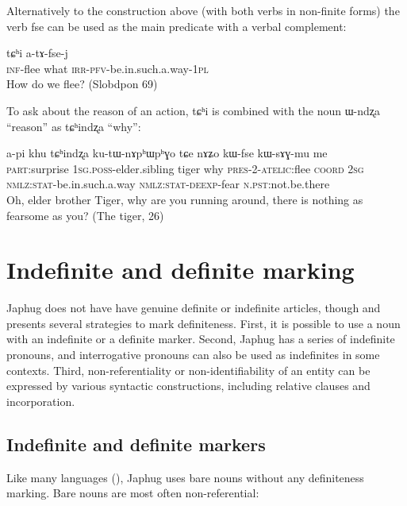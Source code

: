 \documentclass[oldfontcommands,oneside,a4paper,11pt]{memoir}
\newcommand{\ipa}[1]{{\phon #1}} %
\newcommand{\coord}{\textsc{coord}}
\newcommand{\inftv}{\textsc{inf}}
\newcommand{\irr}{\textsc{irr}}
\newcommand{\nmlz}{\textsc{nmlz}}
\newcommand{\npst}{\textsc{n.pst}}
\newcommand{\pfv}{\textsc{pfv}}
\newcommand{\pl}{\textsc{pl}}
\newcommand{\poss}{\textsc{poss}}
\newcommand{\pres}{\textsc{pres}}
\newcommand{\sg}{\textsc{sg}}
\newcommand{\stat}{\textsc{stat}}
\begin{document}
Alternatively to the construction above (with both verbs in non-finite forms) the verb \ipa{fse} can be used as the main predicate with a verbal complement:
   \begin{exe}
\ex
\gll  \ipa{kɤ-pʰɣo} \ipa{tɕʰi} \ipa{a-tɤ-fse-j}    \\
\inftv{}-flee what \irr{}-\pfv{}-be.in.such.a.way-1\pl{}   \\
\glt  How do we flee? (Slobdpon 69)
\end{exe} 

To ask about the reason of an action,  \ipa{tɕʰi} is combined with the noun \ipa{ɯ-ndʐa} ``reason'' as \ipa{tɕʰindʐa} ``why'':
  \begin{exe}
\ex
\gll    \ipa{ama} 	\ipa{a-pi} 	\ipa{khu} 	\ipa{tɕʰindʐa} 	\ipa{ku-tɯ-nɤpʰɯpʰɣo} 	\ipa{tɕe} 	\ipa{nɤʑo} 	\ipa{kɯ-fse} 	\ipa{kɯ-sɤɣ-mu} 	\ipa{me}   \\
\textsc{part}:surprise 1\sg{}.\poss{}-elder.sibling   tiger why \pres{}-2-\textsc{atelic}:flee \coord{} 2\sg{} \nmlz{}:\stat{}-be.in.such.a.way \nmlz{}:\stat{}-\textsc{deexp}-fear \npst{}:not.be.there \\
\glt Oh, elder brother Tiger, why are you running around, there is nothing as fearsome as you?  (The tiger, 26)
\end{exe} 

 

\section{Indefinite and definite marking}
Japhug does not have have genuine definite or indefinite articles, though and presents several strategies to mark definiteness. First, it is possible to use a noun with an indefinite or a definite marker. Second, Japhug has a series of indefinite pronouns, and interrogative pronouns can also be used as indefinites in some contexts. Third, non-referentiality or non-identifiability of an entity can be expressed by various syntactic constructions, including relative clauses and incorporation.


\subsection{Indefinite and definite markers}
Like many languages (\citealt[130]{creissels06sgit1}), Japhug  uses bare nouns without any definiteness marking. Bare nouns are most often non-referential:
\end{document}
